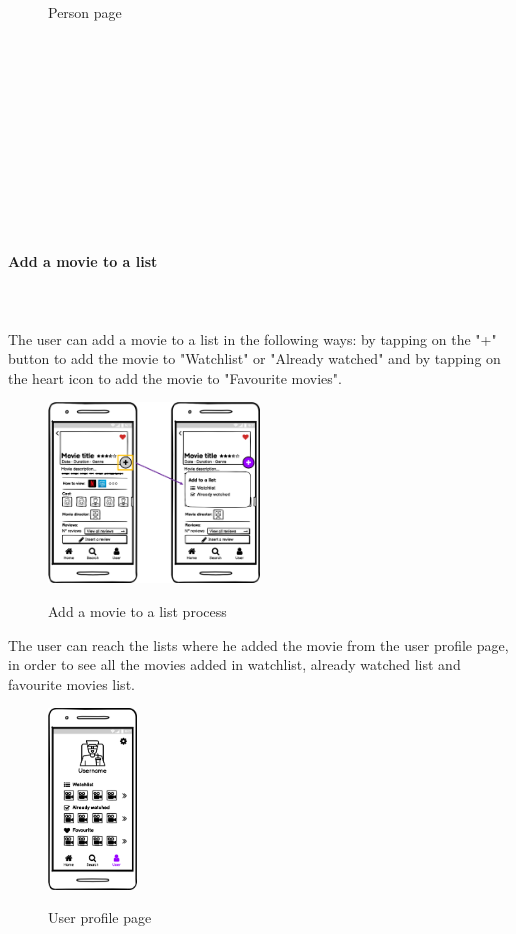 \documentclass[12pt, a4paper]{article}
\numberwithin{figure}{section}
\begin{document}
\begin{center}
\begin{minipage}{0.4\textwidth}
\begin{figure}[H]
			\caption{Person page}
		\end{figure}
	\end{minipage}
\end{center}
\mbox{}\\\\\\\\\\\\\\\\\\\\
\paragraph{Add a movie to a list}
\mbox{}\\\\
The user can add a movie to a list in the following ways: by tapping on the "+" button to add the movie to
"Watchlist" or "Already watched" and by tapping on the heart icon to add the movie to "Favourite movies".
\mbox{}
\begin{figure}[H]
	\centering
	\includegraphics[width=0.5\textwidth]{images/mockups/addMovie.png}\\
	\caption{Add a movie to a list process}
\end{figure}
\noindent
The user can reach the lists where he added the movie from the user profile page,
in order to see all the movies added in watchlist, already watched list and favourite movies list.\\
\begin{figure}[H]
	\centering
	\includegraphics[width=0.21\textwidth]{images/mockups/User profile.png}\\
	\caption{User profile page}
\end{figure}
\end{document}
